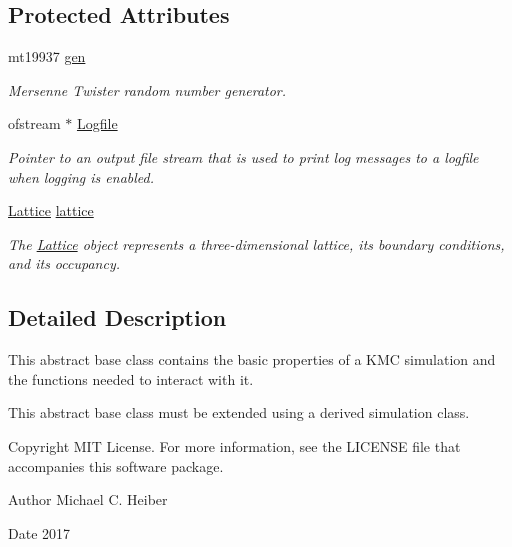 \subsection*{Protected Attributes}
\begin{DoxyCompactItemize}
\item 
\mbox{\label{class_simulation_acdfae37bde7eb7e895d29e210c1f8bcc}} 
mt19937 \hyperlink{class_simulation_acdfae37bde7eb7e895d29e210c1f8bcc}{gen}
\begin{DoxyCompactList}\small\item\em Mersenne Twister random number generator. \end{DoxyCompactList}\item 
\mbox{\label{class_simulation_a7cdc6b74a1a2efb1e031bbaac603c6ad}} 
ofstream $\ast$ \hyperlink{class_simulation_a7cdc6b74a1a2efb1e031bbaac603c6ad}{Logfile}
\begin{DoxyCompactList}\small\item\em Pointer to an output file stream that is used to print log messages to a logfile when logging is enabled. \end{DoxyCompactList}\item 
\mbox{\label{class_simulation_afb2cf4feeb4d8292eeba8f9ef393c6a4}} 
\hyperlink{class_lattice}{Lattice} \hyperlink{class_simulation_afb2cf4feeb4d8292eeba8f9ef393c6a4}{lattice}
\begin{DoxyCompactList}\small\item\em The \hyperlink{class_lattice}{Lattice} object represents a three-\/dimensional lattice, its boundary conditions, and its occupancy. \end{DoxyCompactList}\end{DoxyCompactItemize}


\subsection{Detailed Description}
This abstract base class contains the basic properties of a K\+MC simulation and the functions needed to interact with it. 

This abstract base class must be extended using a derived simulation class. \begin{DoxyCopyright}{Copyright}
M\+IT License. For more information, see the L\+I\+C\+E\+N\+SE file that accompanies this software package. 
\end{DoxyCopyright}
\begin{DoxyAuthor}{Author}
Michael C. Heiber 
\end{DoxyAuthor}
\begin{DoxyDate}{Date}
2017 
\end{DoxyDate}


